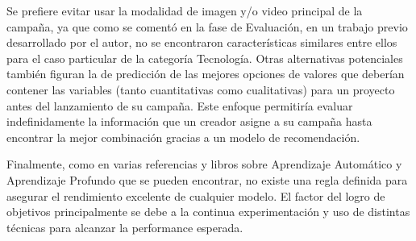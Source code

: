 Se prefiere evitar usar la modalidad de imagen y/o video principal de la campaña, ya que como se comentó en la fase de Evaluación, en un trabajo previo desarrollado por el autor, no se encontraron características similares entre ellos para el caso particular de la categoría Tecnología. Otras alternativas potenciales también figuran la de predicción de las mejores opciones de valores que deberían contener las variables (tanto cuantitativas como cualitativas) para un proyecto antes del lanzamiento de su campaña. Este enfoque permitiría evaluar indefinidamente la información que un creador asigne a su campaña hasta encontrar la mejor combinación gracias a un modelo de recomendación.

Finalmente, como en varias referencias y libros sobre Aprendizaje Automático y Aprendizaje Profundo que se pueden encontrar, no existe una regla definida para asegurar el rendimiento excelente de cualquier modelo. El factor del logro de objetivos principalmente se debe a la continua experimentación y uso de distintas técnicas para alcanzar la performance esperada.